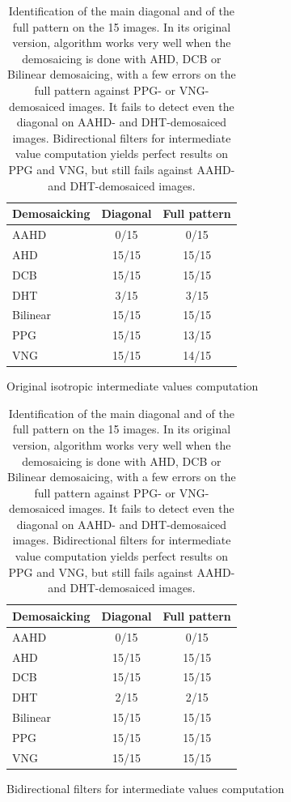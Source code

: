\documentclass{ipol}
\begin{document}
\begin{table}[ht]
    \centering
        \begin{subfigure}[t]{.5\linewidth}
                \centering
    \begin{tabular}{lcc}
    \toprule
    Demosaicking & Diagonal & Full pattern\\
    \midrule
    AAHD & \color{c2}0/15 & \color{c2}0/15\\
    AHD & \color{c0}15/15 & \color{c0}15/15\\
    DCB & \color{c0}15/15 & \color{c0}15/15\\
    DHT & \color{c2}3/15 & \color{c2}3/15\\
    Bilinear & \color{c0}15/15 & \color{c0}15/15\\
    PPG & \color{c0}15/15 & \color{c3}13/15\\
    VNG & \color{c0}15/15 & \color{c3}14/15\\
    \bottomrule
    \end{tabular}
                \caption{Original isotropic intermediate values computation}
        \end{subfigure}\hfill%
        \begin{subfigure}[t]{.5\linewidth}
                \centering
    \begin{tabular}{lcc}
    \toprule
    Demosaicking & Diagonal & Full pattern\\
    \midrule
    AAHD & \color{c2}0/15 & \color{c2}0/15\\
    AHD & \color{c0}15/15 & \color{c0}15/15\\
    DCB & \color{c0}15/15 & \color{c0}15/15\\
    DHT & \color{c2}2/15 & \color{c2}2/15\\
    Bilinear & \color{c0}15/15 & \color{c0}15/15\\
    PPG & \color{c0}15/15 & \color{c0}15/15\\
    VNG & \color{c0}15/15 & \color{c0}15/15\\
    \bottomrule
    \end{tabular}
                \caption{Bidirectional filters for intermediate values computation}
        \end{subfigure}\hfill%
    \label{tab:global}
    \caption{Identification of the main diagonal and of the full pattern on the 15 images. In its original version, algorithm works very well when the demosaicing is done with AHD, DCB or Bilinear demosaicing, with a few errors on the full pattern against PPG- or VNG-demosaiced images. It fails to detect even the diagonal on AAHD- and DHT-demosaiced images. Bidirectional filters for intermediate value computation yields perfect results on PPG and VNG, but still fails against AAHD- and DHT-demosaiced images.}
\end{table}
\end{document}
